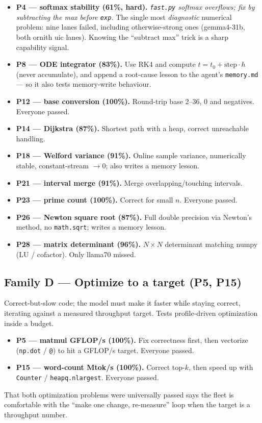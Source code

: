 \documentclass[11pt]{article}
\begin{document}
\begin{itemize}
\item \textbf{P4 --- softmax stability (61\%, hard).} \emph{\texttt{fast.py} softmax
  overflows; fix by subtracting the max before \texttt{exp}.} The single most
  \emph{diagnostic} numerical problem: nine lanes failed, including otherwise-strong
  ones (gemma4-31b, both ornith uic lanes). Knowing the ``subtract max'' trick is a
  sharp capability signal.
\item \textbf{P8 --- ODE integrator (83\%).} Use RK4 and compute
  $t=t_0+\text{step}\cdot h$ (never accumulate), and append a root-cause lesson to
  the agent's \texttt{memory.md} --- so it also tests memory-write behaviour.
\item \textbf{P12 --- base conversion (100\%).} Round-trip base 2--36, 0 and
  negatives. Everyone passed.
\item \textbf{P14 --- Dijkstra (87\%).} Shortest path with a heap, correct
  unreachable handling.
\item \textbf{P18 --- Welford variance (91\%).} Online sample variance, numerically
  stable, constant-stream $\to 0$; also writes a memory lesson.
\item \textbf{P21 --- interval merge (91\%).} Merge overlapping/touching intervals.
\item \textbf{P23 --- prime count (100\%).} Correct for small $n$. Everyone passed.
\item \textbf{P26 --- Newton square root (87\%).} Full double precision via Newton's
  method, no \texttt{math.sqrt}; writes a memory lesson.
\item \textbf{P28 --- matrix determinant (96\%).} $N\times N$ determinant matching
  numpy (LU / cofactor). Only llama70 missed.
\end{itemize}

\subsection{Family D --- Optimize to a target (P5, P15)}
Correct-but-slow code; the model must make it faster while staying correct, iterating
against a measured throughput target. Tests profile-driven optimization inside a
budget.

\begin{itemize}
\item \textbf{P5 --- matmul GFLOP/s (100\%).} Fix correctness first, then vectorize
  (\texttt{np.dot} / \texttt{@}) to hit a GFLOP/s target. Everyone passed.
\item \textbf{P15 --- word-count Mtok/s (100\%).} Correct top-$k$, then speed up with
  \texttt{Counter} / \texttt{heapq.nlargest}. Everyone passed.
\end{itemize}
That both optimization problems were universally passed says the fleet is comfortable
with the ``make one change, re-measure'' loop when the target is a throughput number.
\end{document}
